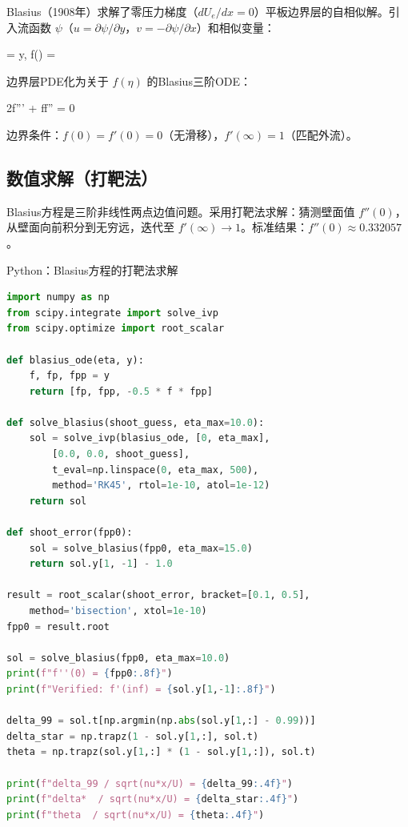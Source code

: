 Blasius（1908年）求解了零压力梯度（$dU_e/dx=0$）平板边界层的自相似解。引入流函数 $\psi$（$u=\partial\psi/\partial y$，$v=-\partial\psi/\partial x$）和相似变量：

\begin{myformula}
    \eta = y,\qquad
    f(\eta) = 
\end{myformula}

边界层PDE化为关于 $f(\eta)$ 的Blasius三阶ODE：

\begin{myformula}
    2f''' + ff'' = 0
\end{myformula}

边界条件：$f(0)=f'(0)=0$（无滑移），$f'(\infty)=1$（匹配外流）。

\subsection{数值求解（打靶法）}

Blasius方程是三阶非线性两点边值问题。采用打靶法求解：猜测壁面值 $f''(0)$，从壁面向前积分到无穷远，迭代至 $f'(\infty) \to 1$。标准结果：$f''(0) \approx 0.332057$。

\begin{mycode}{Python：Blasius方程的打靶法求解}
\begin{lstlisting}[language=Python]
import numpy as np
from scipy.integrate import solve_ivp
from scipy.optimize import root_scalar

def blasius_ode(eta, y):
    f, fp, fpp = y
    return [fp, fpp, -0.5 * f * fpp]

def solve_blasius(shoot_guess, eta_max=10.0):
    sol = solve_ivp(blasius_ode, [0, eta_max],
        [0.0, 0.0, shoot_guess],
        t_eval=np.linspace(0, eta_max, 500),
        method='RK45', rtol=1e-10, atol=1e-12)
    return sol

def shoot_error(fpp0):
    sol = solve_blasius(fpp0, eta_max=15.0)
    return sol.y[1, -1] - 1.0

result = root_scalar(shoot_error, bracket=[0.1, 0.5],
    method='bisection', xtol=1e-10)
fpp0 = result.root

sol = solve_blasius(fpp0, eta_max=10.0)
print(f"f''(0) = {fpp0:.8f}")
print(f"Verified: f'(inf) = {sol.y[1,-1]:.8f}")

delta_99 = sol.t[np.argmin(np.abs(sol.y[1,:] - 0.99))]
delta_star = np.trapz(1 - sol.y[1,:], sol.t)
theta = np.trapz(sol.y[1,:] * (1 - sol.y[1,:]), sol.t)

print(f"delta_99 / sqrt(nu*x/U) = {delta_99:.4f}")
print(f"delta*  / sqrt(nu*x/U) = {delta_star:.4f}")
print(f"theta  / sqrt(nu*x/U) = {theta:.4f}")
\end{lstlisting}
\end{mycode}

